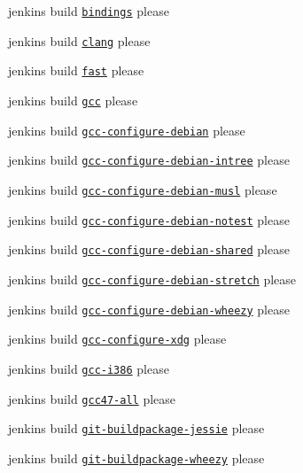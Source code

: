 \begin{DoxyItemize}
\item jenkins build \href{http://build.libelektra.org:8080/job/elektra-test-bindings/}{\tt bindings} please
\item jenkins build \href{http://build.libelektra.org:8080/job/elektra-clang/}{\tt clang} please
\item jenkins build \href{http://build.libelektra.org:8080/job/elektra-mergerequests-fast/}{\tt fast} please
\item jenkins build \href{http://build.libelektra.org:8080/job/elektra-gcc/}{\tt gcc} please
\item jenkins build \href{http://build.libelektra.org:8080/job/elektra-gcc-configure-debian/}{\tt gcc-\/configure-\/debian} please
\item jenkins build \href{http://build.libelektra.org:8080/job/elektra-gcc-configure-debian-intree/}{\tt gcc-\/configure-\/debian-\/intree} please
\item jenkins build \href{http://build.libelektra.org:8080/job/elektra-gcc-configure-debian-musl/}{\tt gcc-\/configure-\/debian-\/musl} please
\item jenkins build \href{http://build.libelektra.org:8080/job/elektra-gcc-configure-debian-notest/}{\tt gcc-\/configure-\/debian-\/notest} please
\item jenkins build \href{http://build.libelektra.org:8080/job/elektra-gcc-configure-debian-shared/}{\tt gcc-\/configure-\/debian-\/shared} please
\item jenkins build \href{http://build.libelektra.org:8080/job/elektra-gcc-configure-debian-stretch/}{\tt gcc-\/configure-\/debian-\/stretch} please
\item jenkins build \href{http://build.libelektra.org:8080/job/elektra-gcc-configure-debian-wheezy/}{\tt gcc-\/configure-\/debian-\/wheezy} please
\item jenkins build \href{http://build.libelektra.org:8080/job/elektra-gcc-configure-xdg/}{\tt gcc-\/configure-\/xdg} please
\item jenkins build \href{http://build.libelektra.org:8080/job/elektra-gcc-i386/}{\tt gcc-\/i386} please
\item jenkins build \href{http://build.libelektra.org:8080/job/elektra-gcc47-all/}{\tt gcc47-\/all} please
\item jenkins build \href{http://build.libelektra.org:8080/job/elektra-git-buildpackage-jessie/}{\tt git-\/buildpackage-\/jessie} please
\item jenkins build \href{http://build.libelektra.org:8080/job/elektra-git-buildpackage-wheezy/}{\tt git-\/buildpackage-\/wheezy} please

\end{DoxyItemize}
